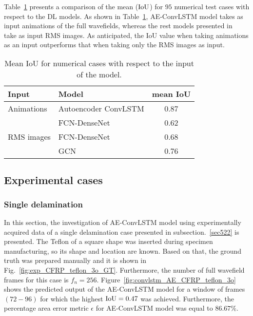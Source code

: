 Table~\ref{tab:meanIoU_vs_input} presents a comparison of the mean (\({\textup{IoU}}\)) for \(95\) numerical test cases with respect to the DL models.
As shown in Table~\ref{tab:meanIoU_vs_input}, AE-ConvLSTM model takes as input animations of the full wavefields, whereas the rest models presented in~\cite{Ijjeh2021, Ijjeh2022} take as input RMS images.
As anticipated, the IoU value when taking animations as an input outperforms that when taking only the RMS images as input. 
\begin{table}[!h]
	\centering
	\caption{Mean IoU for numerical cases with respect to the input of the model.}
	\begin{tabular}{llc}
		\toprule
		Input & Model & mean IoU \\ 
		\midrule
		Animations & Autoencoder ConvLSTM & 0.87 \\ 
		\midrule
		\multirow{3}{*}{RMS images}  
		& FCN-DenseNet~\cite{Ijjeh2021} & 0.62   \\
		& FCN-DenseNet~\cite{Ijjeh2022} & 0.68   \\
		& GCN~\cite{Ijjeh2022}          & 0.76   \\ 
		\bottomrule
	\end{tabular}
	\label{tab:meanIoU_vs_input}
\end{table}
\clearpage
\subsection{Experimental cases}
\label{sec532}

\subsubsection{Single delamination}
\label{sec5321}
In this section, the investigation of AE-ConvLSTM model using experimentally acquired data of a single delamination case presented in subsection.~\ref{sec522} is presented. 
The Teflon of a square shape was inserted during specimen manufacturing, so its shape and location are known.
Based on that, the ground truth was prepared manually and it is shown in Fig.~\ref{fig:exp_CFRP_teflon_3o_GT}. 
Furthermore, the number of full wavefield frames for this case is \(f_n = 256\).
Figure~\ref{fig:convlstm_AE_CFRP_teflon_3o} shows the predicted output of the AE-ConvLSTM model for a window of frames \((72-96)\) for which the highest \(\textup{IoU}=0.47\) was achieved.
Furthermore, the percentage area error metric \(\epsilon\) for AE-ConvLSTM model was equal to \(86.67\%\).


